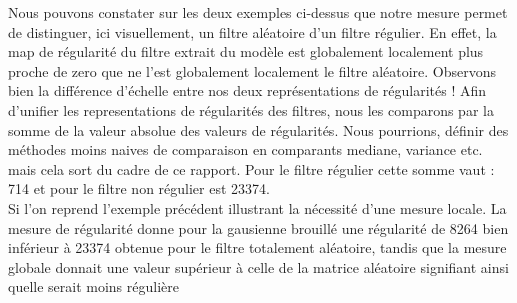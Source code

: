 \documentclass[12pt,a4paper]{article}
\begin{document}
Nous pouvons constater sur les deux exemples ci-dessus que notre mesure permet de distinguer, ici visuellement, un filtre aléatoire d'un filtre régulier. En effet, la map de régularité du filtre extrait du modèle est globalement localement plus proche de zero que ne l'est globalement localement le filtre aléatoire. Observons bien la différence d'échelle entre nos deux représentations de régularités !
Afin d'unifier les representations de régularités des filtres, nous les comparons par la somme de la valeur absolue des valeurs de régularités. Nous pourrions, définir des méthodes moins naives de comparaison en comparants mediane, variance etc. mais cela sort du cadre de ce rapport.
Pour le filtre régulier cette somme vaut : 714 et pour le filtre non régulier est 23374. 
\\
Si l'on reprend l'exemple précédent illustrant la nécessité d'une mesure locale. La mesure de régularité donne pour la gausienne brouillé une régularité de 8264 bien inférieur à 23374 obtenue pour le filtre totalement aléatoire, tandis que la mesure globale donnait une valeur supérieur à celle de la matrice aléatoire signifiant ainsi quelle serait moins régulière
\end{document}

